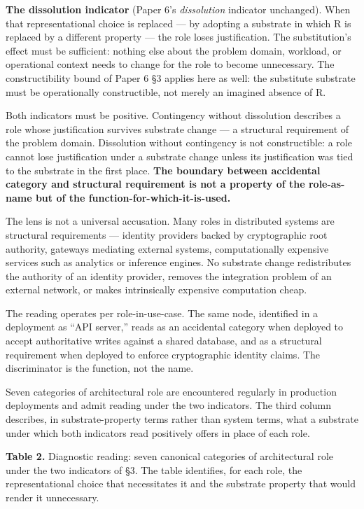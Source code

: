 \documentclass[
]{article}
\begin{document}
\textbf{The dissolution indicator} (Paper 6's \emph{dissolution}
indicator unchanged). When that representational choice is replaced ---
by adopting a substrate in which R is replaced by a different property
--- the role loses justification. The substitution's effect must be
sufficient: nothing else about the problem domain, workload, or
operational context needs to change for the role to become unnecessary.
The constructibility bound of Paper 6 §3 applies here as well: the
substitute substrate must be operationally constructible, not merely an
imagined absence of R.

Both indicators must be positive. Contingency without dissolution
describes a role whose justification survives substrate change --- a
structural requirement of the problem domain. Dissolution without
contingency is not constructible: a role cannot lose justification under
a substrate change unless its justification was tied to the substrate in
the first place. \textbf{The boundary between accidental category and
structural requirement is not a property of the role-as-name but of the
function-for-which-it-is-used.}

The lens is not a universal accusation. Many roles in distributed
systems are structural requirements --- identity providers backed by
cryptographic root authority, gateways mediating external systems,
computationally expensive services such as analytics or inference
engines. No substrate change redistributes the authority of an identity
provider, removes the integration problem of an external network, or
makes intrinsically expensive computation cheap.

The reading operates per role-in-use-case. The same node, identified in
a deployment as ``API server,'' reads as an accidental category when
deployed to accept authoritative writes against a shared database, and
as a structural requirement when deployed to enforce cryptographic
identity claims. The discriminator is the function, not the name.

Seven categories of architectural role are encountered regularly in
production deployments and admit reading under the two indicators. The
third column describes, in substrate-property terms rather than system
terms, what a substrate under which both indicators read positively
offers in place of each role.

\textbf{Table 2.} Diagnostic reading: seven canonical categories of
architectural role under the two indicators of §3. The table identifies,
for each role, the representational choice that necessitates it and the
substrate property that would render it unnecessary.
\end{document}
